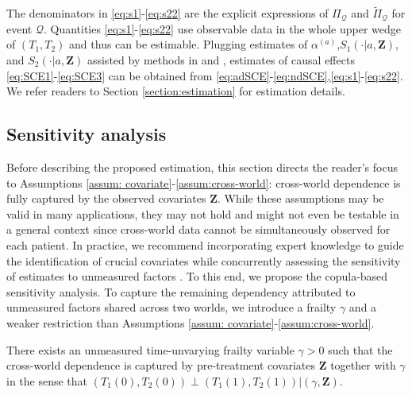 \documentclass[APA,Times1COL]{WileyNJDv5} %
\theoremstyle{plain}
\def\bfZ{\mathbf{Z}}
\begin{document}
The denominators in \eqref{eq:s1}-\eqref{eq:s22} are the explicit expressions of $\Pi_{\mathcal{Q}}$ and $\widetilde{\Pi}_{\mathcal{Q}}$ for event $\mathcal{Q}$. 
Quantities \eqref{eq:s1}-\eqref{eq:s22} use observable data in the whole upper wedge of $(T_1, T_2)$ and thus can be estimable. Plugging estimates of $\alpha^{(a)}$,$S_1(\cdot|a,\bfZ)$, and $S_2(\cdot|a,\bfZ)$ assisted  by methods in \cite{peng2007semicompeting} and \cite{zhu2022nee}, estimates of causal effects \eqref{eq:SCE1}-\eqref{eq:SCE3} can be obtained from \eqref{eq:adSCE}-\eqref{eq:ndSCE},\eqref{eq:s1}-\eqref{eq:s22}. We refer readers to Section \ref{section:estimation} for estimation details.

\subsection{Sensitivity analysis}\label{section:sensitivity}
 
Before describing the proposed estimation, this section directs the reader's focus to Assumptions \ref{assum: covariate}-\ref{assum:cross-world}: cross-world dependence is fully captured by the observed covariates $\bfZ$. While these assumptions may be valid in many applications, they may not hold and might not even be testable in a general context since cross-world data cannot be simultaneously observed for each patient. 
In practice, we recommend incorporating expert knowledge to guide the identification of crucial covariates while concurrently assessing the sensitivity of estimates to unmeasured factors \citep{axelrod2022sensitivity,Nevo2022semicompeting}. To this end, we propose the copula-based sensitivity analysis. To capture the remaining dependency attributed to unmeasured factors shared across two worlds, we introduce a frailty $\gamma$ and a weaker restriction than Assumptions \ref{assum: covariate}-\ref{assum:cross-world}. 
\begin{assumption}
There exists an unmeasured time-unvarying frailty variable $\gamma>0$ such that the cross-world dependence is captured by pre-treatment covariates $\bfZ$ together with $\gamma$ in the sense that $(T_1(0),T_2(0))\perp (T_1(1),T_2(1))|(\gamma,\bfZ)$.
\label{assum:frailty}
\end{assumption}
\end{document}
